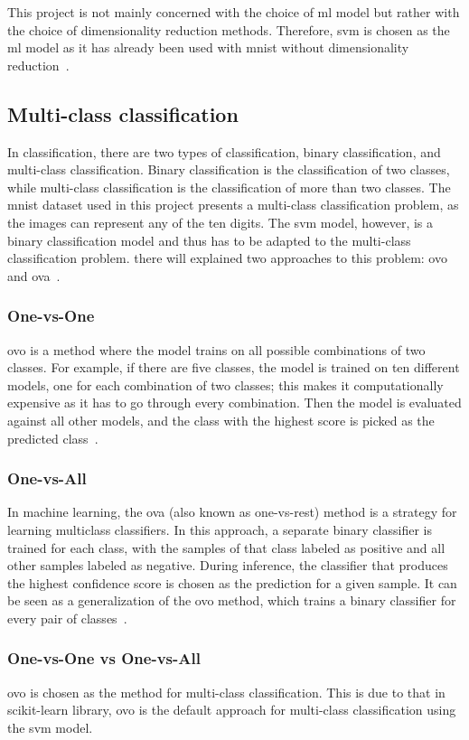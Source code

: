 This project is not mainly concerned with the choice of \gls{ml} model but rather with the choice of dimensionality reduction methods. Therefore, \gls{svm} is chosen as the \gls{ml} model as it has already been used with \gls{mnist} without dimensionality reduction~\cite{lecun-mnist-database}.



\subsection{Multi-class classification}\label{subsec:multi-class}
In classification, there are two types of classification, binary classification, and multi-class classification. Binary classification is the classification of two classes, while multi-class classification is the classification of more than two classes. The \gls{mnist} dataset used in this project presents a multi-class classification problem, as the images can represent any of the ten digits. The \gls{svm} model, however, is a binary classification model and thus has to be adapted to the multi-class classification problem. there will explained two approaches to this problem: \gls{ovo} and \gls{ova}~\cite{james-statistical-learning1}.

\subsubsection{One-vs-One}\label{subsubsec:one-vs-one}
\gls{ovo} is a method where the model trains on all possible combinations of two classes. For example, if there are five classes, the model is trained on ten different models, one for each combination of two classes; this makes it computationally expensive as it has to go through every combination. Then the model is evaluated against all other models, and the class with the highest score is picked as the predicted class~\cite{james-statistical-learning1}.

\subsubsection{One-vs-All}\label{subsubsec:one-vs-all}
In machine learning, the \gls{ova} (also known as one-vs-rest) method is a strategy for learning multiclass classifiers. In this approach, a separate binary classifier is trained for each class, with the samples of that class labeled as positive and all other samples labeled as negative. During inference, the classifier that produces the highest confidence score is chosen as the prediction for a given sample. It can be seen as a generalization of the \gls{ovo} method, which trains a binary classifier for every pair of classes~\cite{james-statistical-learning1}.

\subsubsection{One-vs-One vs One-vs-All}\label{subsubsec:one-vs-one-vs-one-vs-all}
\gls{ovo} is chosen as the method for multi-class classification. This is due to that in scikit-learn library, \gls{ovo} is the default approach for multi-class classification using the \gls{svm} model. 